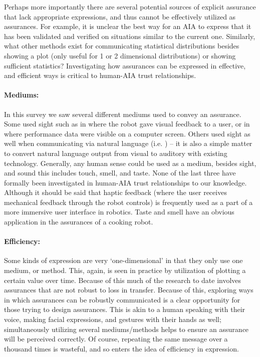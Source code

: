     Perhaps more importantly there are several potential sources of explicit assurance that lack appropriate expressions, and thus cannot be effectively utilized as assurances. For example, it is unclear the best way for an AIA to express that it has been validated and verified on situations similar to the current one. Similarly, what other methods exist for communicating statistical distributions besides showing a plot (only useful for 1 or 2 dimensional distributions) or showing sufficient statistics? Investigating how assurances can be expressed in effective, and efficient ways is critical to human-AIA trust relationships.

    \paragraph{Mediums:} In this survey we saw several different mediums used to convey an assurance. Some used sight such as in \cite{Chadalavada2015-wx} where the robot gave visual feedback to a user, or in \cite{Muir1996-gt} where performance data were visible on a computer screen. Others used sight as well when communicating via natural language (i.e. \cite{Wang2016-id}) -- it is also a simple matter to convert natural language output from visual to auditory with existing technology. Generally, any human sense could be used as a medium, besides sight, and sound this includes touch, smell, and taste. None of the last three have formally been investigated in human-AIA trust relationships to our knowledge. Although it should be said that haptic feedback (where the user receives mechanical feedback through the robot controls) is frequently used as a part of a more immersive user interface in robotics. Taste and smell have an obvious application in the assurances of a cooking robot.

    \paragraph{Efficiency:} Some kinds of expression are very `one-dimensional' in that they only use one medium, or method. This, again, is seen in practice by utilization of plotting a certain value over time. Because of this much of the research to date involves assurances that are not robust to loss in transfer. Because of this, exploring ways in which assurances can be robustly communicated is a clear opportunity for those trying to design assurances. This is akin to a human speaking with their voice, making facial expressions, and gestures with their hands as well; simultaneously utilizing several mediums/methods helps to ensure an assurance will be perceived correctly. Of course, repeating the same message over a thousand times is wasteful, and so enters the idea of efficiency in expression.

